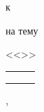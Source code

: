 \begin{center}
\begin{center}
\vspace{0.35cm}

к\xspace\doctypeb

\vspace{0.4cm}



{\smaller[1]
на тему

<<\Title>>}
\end{center}

\vspace{3.0cm}

\large

\begin{tabular}{p{}P{0.25\textwidth}P{0.25\textwidth}} 
 \\[10pt]
 \\[10pt]
 \\[10pt]
\end{tabular}

\vspace{4.5cm}

\City, \Year

\end{center}




